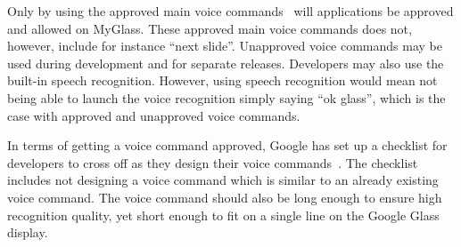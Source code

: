 Only by using the approved main voice commands~\cite{existingVoiceCommands} will applications be approved and allowed on MyGlass. These approved main voice commands does not, however, include for instance ``next slide''. Unapproved voice commands may be used during development and for separate releases. Developers may also use the built-in speech recognition. However, using speech recognition would mean not being able to launch the voice recognition simply saying ``ok glass'', which is the case with approved and unapproved voice commands.

In terms of getting a voice command approved, Google has set up a checklist for developers to cross off as they design their voice commands~\cite{glassVoiceChecklist}. The checklist includes not designing a voice command which is similar to an already existing voice command. The voice command should also be long enough to ensure high recognition quality, yet short enough to fit on a single line on the Google Glass display.%